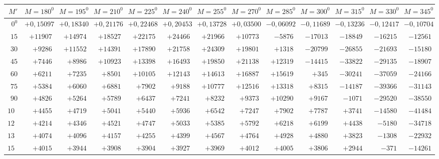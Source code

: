 \begin{landscape}
\begin{center}
\begin{tabular}{@{}r|*{11}{r|}r@{}}
\end{tabular}
\end{center}
\clearpage
\begin{center}
\begin{tabular}{@{}r|*{11}{r|}r@{}}
\hline
\(M'\) & \(M=180^0\) & \(M=195^0\) & \(M=210^0\) & \(M=225^0\) & \(M=240^0\) & \(M=255^0\) & \(M=270^0\) & \(M=285^0\) & \(M=300^0\) & \(M=315^0\) & \(M=330^0\) & \(M=345^0\)\\
\hline
\(0^0\) & \(+0{,}15097\) & \(+0{,}18340\) & \(+0{,}21176\) & \(+0{,}22468\) & \(+0{,}20453\) & \(+0{,}13728\) & \(+0{,}03500\) & \(-0{,}06092\) & \(-0{,}11689\) & \(-0{,}13236\) & \(-0{,}12417\) & \(-0{,}10704\)\\
\(15\) & \(+11907\) & \(+14974\) & \(+18527\) & \(+22175\) & \(+24466\) & \(+21966\) & \(+10773\) & \(-5876\) & \(-17013\) & \(-18849\) & \(-16215\) & \(-12561\)\\
\(30\) & \(+9286\) & \(+11552\) & \(+14391\) & \(+17890\) & \(+21758\) & \(+24309\) & \(+19801\) & \(+1318\) & \(-20799\) & \(-26855\) & \(-21693\) & \(-15180\)\\
\(45\) & \(+7446\) & \(+8986\) & \(+10923\) & \(+13398\) & \(+16493\) & \(+19850\) & \(+21138\) & \(+12319\) & \(-14415\) & \(-33822\) & \(-29135\) & \(-18907\)\\
\(60\) & \(+6211\) & \(+7235\) & \(+8501\) & \(+10105\) & \(+12143\) & \(+14613\) & \(+16887\) & \(+15619\) & \(+345\) & \(-30241\) & \(-37059\) & \(-24166\)\\
\(75\) & \(+5384\) & \(+6060\) & \(+6881\) & \(+7902\) & \(+9188\) & \(+10777\) & \(+12516\) & \(+13318\) & \(+8315\) & \(-14187\) & \(-39366\) & \(-31143\)\\
\(90\) & \(+4826\) & \(+5264\) & \(+5789\) & \(+6437\) & \(+7241\) & \(+8232\) & \(+9373\) & \(+10290\) & \(+9167\) & \(-1071\) & \(-29520\) & \(-38550\)\\
\(105\) & \(+4455\) & \(+4719\) & \(+5041\) & \(+5440\) & \(+5936\) & \(+6542\) & \(+7247\) & \(+7902\) & \(+7787\) & \(+3741\) & \(-14580\) & \(-41484\)\\
\(120\) & \(+4214\) & \(+4346\) & \(+4521\) & \(+4747\) & \(+5033\) & \(+5385\) & \(+5792\) & \(+6218\) & \(+6199\) & \(+4438\) & \(-5180\) & \(-34718\)\\
\(135\) & \(+4074\) & \(+4096\) & \(+4157\) & \(+4255\) & \(+4399\) & \(+4567\) & \(+4764\) & \(+4928\) & \(+4880\) & \(+3823\) & \(-1308\) & \(-22932\)\\
\(150\) & \(+4015\) & \(+3944\) & \(+3908\) & \(+3904\) & \(+3927\) & \(+3969\) & \(+4012\) & \(+4005\) & \(+3806\) & \(+2944\) & \(-371\) & \(-14261\)\\

\end{tabular}
\end{center}
\end{landscape}
